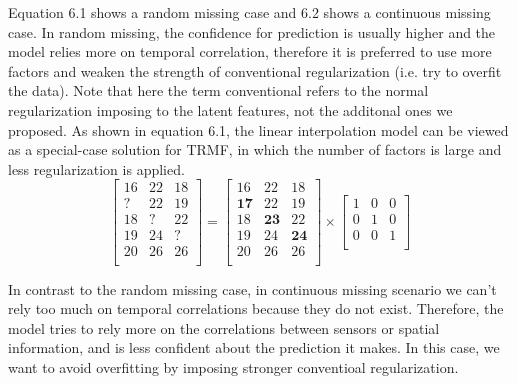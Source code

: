 Equation 6.1 shows a random missing case and 6.2 shows a continuous missing case. In random missing, the confidence for prediction is usually higher and the model relies more on temporal correlation, therefore it is preferred to use more factors and weaken the strength of conventional regularization (i.e. try to overfit the data). Note that here the term conventional refers to the normal regularization imposing to the latent features, not the additonal ones we proposed. 
As shown in equation 6.1, the linear interpolation model can be viewed as a special-case solution for TRMF, in which the number of factors is large and less regularization is applied. 
\begin{equation}
\label{randomSplit_matrix}
\begin{bmatrix}
16 & 22 & 18\\
 ? & 22 & 19\\
18 &  ?	& 22\\
19 & 24 &  ?\\
20 & 26 & 26\\
\end{bmatrix} 
= 
\begin{bmatrix}
16 & 22 & 18\\
\mathbf{17} & 22 & 19\\
18 & \mathbf{23}	& 22\\
19 & 24 & \mathbf{24}\\
20 & 26 & 26\\
\end{bmatrix} 
\times
\begin{bmatrix}
1 & 0 & 0\\
0 & 1 & 0\\
0 & 0 & 1\\
\end{bmatrix} 
\end{equation}

In contrast to the random missing case, in continuous missing scenario we can't rely too much on temporal correlations because they do not exist. Therefore, the model tries to rely more on the correlations between sensors or spatial information, and is less confident about the prediction it makes. In this case, we want to avoid overfitting by imposing stronger conventioal regularization.

